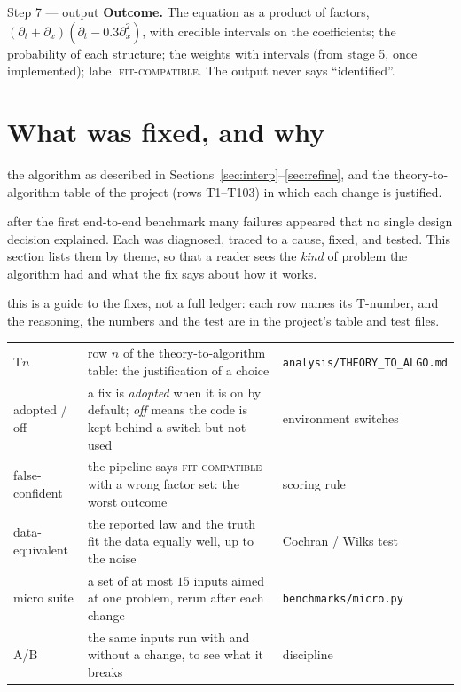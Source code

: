 \documentclass[11pt,a4paper]{article}
\theoremstyle{definition}
\newcommand{\sectionbrief}[3]{\begin{leadin}\begin{description}[nosep,leftmargin=3.0cm,labelwidth=2.8cm]
  \item[Starting from] #1
  \item[Why this section] #2
  \item[Role in the paper] #3
  \end{description}\end{leadin}}
\begin{document}
\begin{wstep}{Step 7 --- output}
\textbf{Outcome.} The equation as a product of factors, $(\partial_t+\partial_x)(\partial_t-0.3\partial_x^2)$, with credible intervals on the coefficients; the probability of each structure; the weights with intervals (from stage 5, once implemented); label \textsc{fit-compatible}. The output never says ``identified''.
\end{wstep}



\section{What was fixed, and why}\label{sec:fixes}
\sectionbrief
{the algorithm as described in Sections~\ref{sec:interp}--\ref{sec:refine}, and the theory-to-algorithm table of the project (rows T1--T103) in which each change is justified.}
{after the first end-to-end benchmark many failures appeared that no single design decision explained. Each was diagnosed, traced to a cause, fixed, and tested. This section lists them by theme, so that a reader sees the \emph{kind} of problem the algorithm had and what the fix says about how it works.}
{this is a guide to the fixes, not a full ledger: each row names its T-number, and the reasoning, the numbers and the test are in the project's table and test files.}

\begin{symbols}
\begin{tabular}{@{}L{2.6cm}L{6.0cm}L{4.3cm}@{}}
T$n$ & row $n$ of the theory-to-algorithm table: the justification of a choice & \texttt{analysis/THEORY\_TO\_ALGO.md}\\
adopted / off & a fix is \emph{adopted} when it is on by default; \emph{off} means the code is kept behind a switch but not used & environment switches\\
false-confident & the pipeline says \textsc{fit-compatible} with a wrong factor set: the worst outcome & scoring rule\\
data-equivalent & the reported law and the truth fit the data equally well, up to the noise & Cochran / Wilks test\\
micro suite & a set of at most $15$ inputs aimed at one problem, rerun after each change & \texttt{benchmarks/micro.py}\\
A/B & the same inputs run with and without a change, to see what it breaks & discipline\\
\end{tabular}
\end{symbols}
\end{document}
